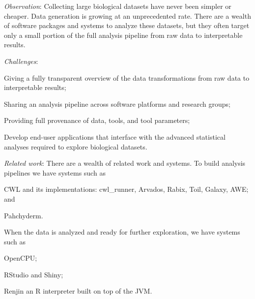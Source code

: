 % 

\emph{Observation}:
Collecting large biological datasets have never been simpler
or cheaper. Data generation is growing at an unprecedented rate. There are a
wealth of software packages and systems to analyze these datasets, but they
often target only a small portion of the full analysis pipeline from raw data to
interpretable results.

\emph{Challenges}:
\begin{enumerate*}[label=(\roman*)]
    \item Giving a fully transparent overview of the data transformations from
        raw data to interpretable results; 
    \item Sharing an analysis pipeline across software platforms and research
        groups; 
    \item Providing full provenance of data, tools, and tool parameters; 
    \item Develop end-user applications that interface with the advanced
        statistical analyses required to explore biological datasets.  
    
\end{enumerate*} 

\emph{Related work}:
There are a wealth of related work and systems. To build analysis pipelines we
have systems such as
\begin{enumerate*}[label=(\roman*)]
    \item CWL and its implementations: cwl\_runner, Arvados, Rabix, Toil, Galaxy,
        AWE; and 
    \item Pahchyderm. 
\end{enumerate*}
When the data is analyzed and ready for further exploration, we have systems
such as
\begin{enumerate*}[label=(\roman*)]
    \item OpenCPU;
    \item RStudio and Shiny; 
    \item Renjin an R interpreter built on top of the JVM. 
\end{enumerate*}
 

